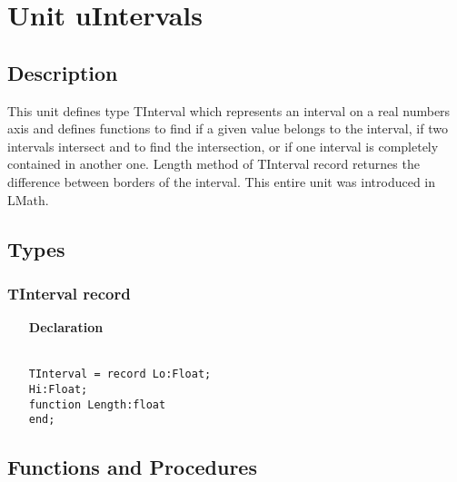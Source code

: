 \documentclass[12pt,a4paper,oneside]{report}
\newcommand{\lmath}[1]{   %
	\marginpar{\vspace{#1} 
		\begin{flushright}
			LMath
	\end{flushright} }
}
\newcommand{\declarationitem}[1]{\textbf{#1}}
\newcommand{\code}[1]{\texttt{#1}}
\begin{document}
\section{Unit uIntervals}\lmath{-24pt}
\subsection{Description}
This unit defines type TInterval which represents an interval on a real numbers axis and defines functions to find if a given value belongs to the interval, if two intervals intersect and to find the intersection, or if one interval is completely contained in another one. Length method of TInterval record returnes the difference between borders of the interval. This entire unit was introduced in LMath.
\label{uIntervals}
\subsection{Types}
\subsubsection{TInterval record}
\begin{itemize}\label{uIntervals.TInterval}
\item[\declarationitem{Declaration}]
\begin{flushleft}
\code{\\
	TInterval = record
		\hspace{1cm}Lo:Float;\\
		\hspace{1cm}Hi:Float;\\
		\hspace{1cm}function Length:float\\
	end;}
\end{flushleft}
\end{itemize}
\subsection{Functions and Procedures}
\end{document}
